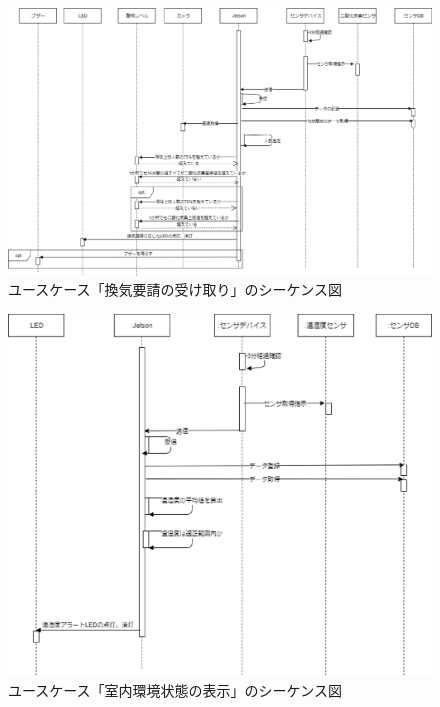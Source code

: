 \begin{figure}[htbp]
    \centering
    \includegraphics[width = 15cm]{./picture/sequence_kanki_2.eps}
    \caption{ユースケース「換気要請の受け取り」のシーケンス図}
    \label{seq_kanki}
\end{figure}
\begin{figure}[htbp]
    \centering
    \includegraphics[width = 15cm]{./picture/sequence_shitsunai_2.eps}
    \caption{ユースケース「室内環境状態の表示」のシーケンス図}
    \label{seq_kankyou}
\end{figure}

